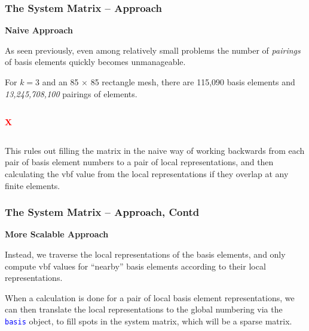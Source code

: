 \documentclass[compress]{beamer}
\begin{document}
\begin{frame}
  \frametitle{The System Matrix -- Approach}
  \textbf{Naive Approach}

  As seen previously, even among relatively small problems the number of \emph{pairings} of basis elements quickly becomes unmanageable.
  
  \pause
  \vspace{.15cm}
  \uncover<+-> {
  For $k=3$ and an 85 $\times$ 85 rectangle mesh, there are 115,090 basis elements and \emph{13,245,708,100} pairings of elements.

  \vspace{.15cm}
  \uncover<+-> {
    \begin{columns}
        \textbf{\textcolor{red}{\Large{X}}}
    \end{columns}
  
  \vspace{.15cm}
  This rules out filling the matrix in the naive way of working backwards from each pair of basis element numbers to a pair of local
  representations, and then calculating the vbf value from the local representations if they overlap at any finite elements.
  }}
\end{frame}

\begin{frame}
  \frametitle{The System Matrix -- Approach, Contd}
  \textbf{More Scalable Approach}

  \vspace{.15cm}
  Instead, we traverse the local representations of the basis elements, and only compute vbf values for ``nearby'' basis  
  elements according to their local representations.
  
  \pause
  \vspace{.15cm}
  When a calculation is done for a pair of local basis element representations, we can then translate the local representations
  to the global numbering via the \texttt{\textcolor{blue}{basis}} object, to fill spots in the system matrix, which will be a
  sparse matrix.
\end{frame}
\end{document}
